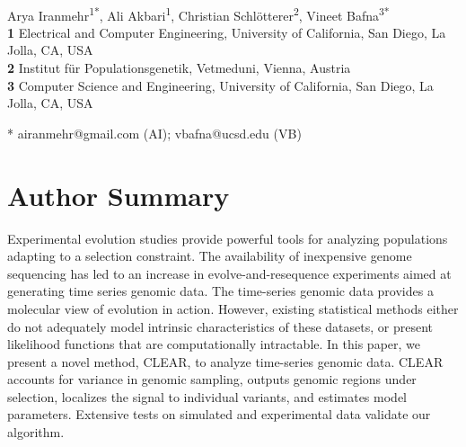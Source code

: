 \documentclass[10pt,letterpaper]{article}
\date{}
\begin{document}
\vspace*{0.2in}

\begin{flushleft}
{\Large
\textbf{}
}
\newline
\\
Arya Iranmehr\textsuperscript{1*},
Ali Akbari\textsuperscript{1},
Christian Schl\"{o}tterer\textsuperscript{2},
Vineet Bafna\textsuperscript{3*}
\\
\bigskip
\textbf{1} Electrical and Computer Engineering, University of California, San 
Diego, La Jolla, CA, USA
\\
\textbf{2} Institut f\"{u}r Populationsgenetik, Vetmeduni, Vienna, Austria
\\
\textbf{3} Computer Science and Engineering, University of California, San 
Diego, La Jolla, CA, USA
\\
\bigskip


* airanmehr@gmail.com (AI); vbafna@ucsd.edu (VB)

\end{flushleft}



\section*{Author Summary}

Experimental evolution studies provide powerful tools for analyzing populations 
adapting to a selection constraint. The availability of inexpensive genome 
sequencing  has led to an increase in evolve-and-resequence experiments aimed 
at generating time series genomic data. The time-series genomic data provides a 
molecular view of evolution in action. However, existing statistical methods 
either do not adequately model intrinsic characteristics of these datasets, or 
present likelihood functions that are computationally intractable. In this 
paper, we present a novel method, CLEAR, to analyze time-series genomic data. 
CLEAR accounts for variance in genomic sampling,  outputs genomic regions under 
selection, localizes the signal to individual variants,  and estimates model 
parameters. Extensive tests on simulated and experimental data validate our 
algorithm.
\end{document}
